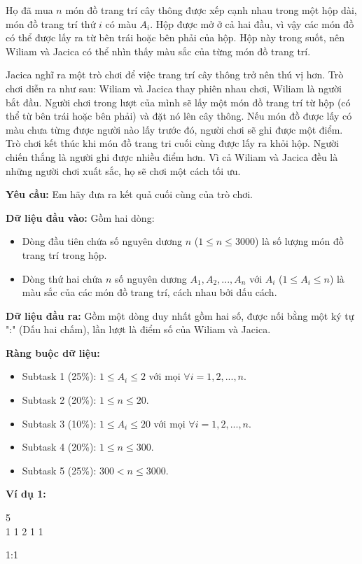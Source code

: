 \documentclass[12pt]{scrartcl}  %
\begin{document}
Họ đã mua $n$ món đồ trang trí cây thông được xếp cạnh nhau trong một hộp dài, món đồ trang trí thứ $i$ có màu $A_i$. 
Hộp được mở ở cả hai đầu, vì vậy các món đồ có thể được lấy ra từ bên trái hoặc bên phải của hộp. Hộp này trong suốt, nên Wiliam và Jacica có thể nhìn thấy màu sắc của từng món đồ trang trí.

Jacica nghĩ ra một trò chơi để việc trang trí cây thông trở nên thú vị hơn. Trò chơi diễn ra như sau: Wiliam và Jacica thay phiên nhau chơi, Wiliam là người bắt đầu. Người chơi trong lượt của mình sẽ lấy một món đồ trang trí từ hộp (có thể từ bên trái hoặc bên phải) và đặt nó lên cây thông. 
Nếu món đồ được lấy có màu chưa từng được người nào lấy trước đó, người chơi sẽ ghi được một điểm. Trò chơi kết thúc khi món đồ trang tri cuối cùng được lấy ra khỏi hộp. Người chiến thắng là người ghi được nhiều điểm hơn. Vì cả Wiliam và Jacica đều là những người chơi xuất sắc, họ sẽ chơi một cách tối ưu.

\textbf{Yêu cầu:}
Em hãy đưa ra kết quả cuối cùng của trò chơi. 

\textbf{Dữ liệu đầu vào:}
Gồm hai dòng:
\begin{itemize}
    \item Dòng đầu tiên chứa số nguyên dương $n$ ($1 \leq n \leq 3000$) là số lượng món đồ trang trí trong hộp.
    \item Dòng thứ hai chứa $n$ số nguyên dương $A_1, A_2, ..., A_n$ với $A_i$ ($1 \leq A_i \leq n$) là màu sắc của các món đồ trang trí, cách nhau bởi dấu cách.
\end{itemize}

\textbf{Dữ liệu đầu ra:}
Gồm một dòng duy nhất gồm hai số, được nối bằng một ký tự ":" (Dấu hai chấm), lần lượt là điểm số của Wiliam và Jacica.

\textbf{Ràng buộc dữ liệu:}
\begin{itemize}
    \item Subtask 1 (25\%): $1 \leq A_i \leq 2$ với mọi $\forall i = 1, 2, ..., n$.
    \item Subtask 2 (20\%): $1 \leq n \leq 20$.
    \item Subtask 3 (10\%): $1 \leq A_i \leq 20$ với mọi $\forall i = 1, 2, ..., n$.
    \item Subtask 4 (20\%): $1 \leq n \leq 300$.
    \item Subtask 5 (25\%): $300 < n \leq 3000$.
\end{itemize}

\textbf{Ví dụ 1:}
\begin{tcolorbox}[colback=gray!5!white, colframe=blue!50!black, title=Input]
5\\
1 1 2 1 1
\end{tcolorbox}
\begin{tcolorbox}[colback=gray!5!white, colframe=green!50!black, title=Output]
1:1
\end{tcolorbox}
\end{document}
